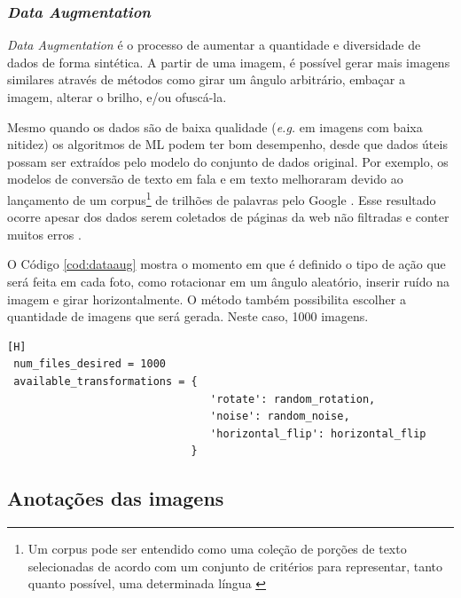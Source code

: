 
\subsubsection*{\textit{Data Augmentation}}\label{sec:dataAugm}

\textit{Data Augmentation} é o processo de aumentar a quantidade e diversidade de dados de forma sintética. A partir de uma imagem, é possível gerar mais imagens similares através de métodos como girar um ângulo arbitrário, embaçar a imagem, alterar o brilho, e/ou ofuscá-la.

Mesmo quando os dados são de baixa qualidade (\textit{e.g.} em imagens com baixa nitidez) os algoritmos de ML podem ter bom desempenho, desde que dados úteis possam ser extraídos pelo modelo do conjunto de dados original. Por exemplo, os modelos de conversão de texto em fala e em texto melhoraram devido ao lançamento de um corpus\footnote{Um corpus pode ser entendido como uma coleção de porções de texto selecionadas de acordo com um conjunto de critérios para representar, tanto quanto possível, uma determinada língua \cite{sinclair2005corpus}} de trilhões de palavras pelo Google \cite{halevy2009unreasonable}. Esse resultado ocorre apesar dos dados serem coletados de páginas da web não filtradas e conter muitos erros \cite{dataAug}.

O Código \ref{cod:dataaug} mostra o momento em que é definido o tipo de ação que será feita em cada foto, como rotacionar em um ângulo aleatório, inserir ruído na imagem e girar horizontalmente. O método também possibilita escolher a quantidade de imagens que será gerada. Neste caso, 1000 imagens.

\begin{lstlisting}[caption=Exemplo de código do método \textit{data augmentation}, label=cod:dataaug][H]
 num_files_desired = 1000
 available_transformations = {
                                'rotate': random_rotation,
                                'noise': random_noise,
                                'horizontal_flip': horizontal_flip
                             }
\end{lstlisting}


\subsection{Anotações das imagens}

